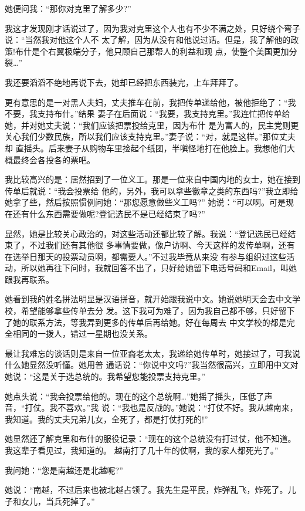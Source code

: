 ﻿\documentclass[11pt]{article}
\begin{document}
她便问我：``那你对克里了解多少?''

我这才发现刚才话说过了，因为我对克里这个人也有不少不满之处，只好绕个弯子说：``当然我对他这个人不
太了解，因为从没有和他说过话。但是，我了解他的政策!布什是个右翼极端分子，他只顾自己那帮人的利益和观
点，使整个美国更加分裂\ldots ''

我还要滔滔不绝地再说下去，她却已经把东西装完，上车拜拜了。

更有意思的是一对黑人夫妇，丈夫推车在前，我把传单递给他，被他拒绝了：``我不要，我支持布什。''结果
妻子在后面说：``我要，我支持克里。''我连忙把传单给她，并对她丈夫说：``我们应该把票投给克里，因为布什
是为富人的，民主党则更关心我们少数民族，所以我们应该支持克里。''妻子说：``对，就是这样。''那位丈夫却
直摇头。后来妻子从购物车里捡起个纸团，半嗔怪地打在他脸上。我想他们大概最终会各投各的票吧。

我比较高兴的是：居然招到了一位义工。那是一位来自中国内地的女士，她在接到传单后就说：``我会投票给
他的，另外，我可以拿些徽章之类的东西吗?''我立即给她拿了些，然后按照惯例问她：``那您愿意做些义工吗?''
她说：``可以啊。可是现在还有什么东西需要做呢?登记选民不是已经结束了吗?''

显然，她是比较关心政治的，对这些活动还都比较了解。我说：``登记选民已经结束了，不过我们还有其他很
多事情要做，像户访啊、今天这样的发传单啊，还有在选举日那天的投票动员啊，都需要人。''不过我毕竟从来没
有参与组织过这些活动，所以她再往下问时，我就回答不出了，只好给她留下电话号码和Email，叫她跟我再联系。

她看到我的姓名拼法明显是汉语拼音，就开始跟我说中文。她说她明天会去中文学校，希望能够拿些传单去分
发。这下我可为难了，因为我自己都不够，只好留下了她的联系方法，等我弄到更多的传单后再给她。好在每周去
中文学校的都是完全相同的一拨人，错过一星期也没关系。

最让我难忘的谈话则是来自一位亚裔老太太，我递给她传单时，她接过了，可我说什么她显然没听懂。她用普
通话说：``你说中文吗?''我当然很高兴，立即用中文对她说：``这是关于选总统的。我希望您能投票支持克里。''


她点头说：``我会投票给他的。现在的这个总统啊\ldots ''她摇了摇头，压低了声音，``打仗。我不喜欢。''我
说：``我也是反战的。''她说：``打仗不好。我从越南来，我知道。我的丈夫兄弟儿女，全死了，都是打仗打死的!''

她显然还了解克里和布什的服役记录：``现在的这个总统没有打过仗，他不知道。我这辈子看见过，我知道的。
越南打了几十年的仗啊，我的家人都死光了。''

我问她：``您是南越还是北越呢?''

她说：``南越，不过后来也被北越占领了。我先生是平民，炸弹乱飞，炸死了。儿子和女儿，当兵死掉了。''
\end{document}
